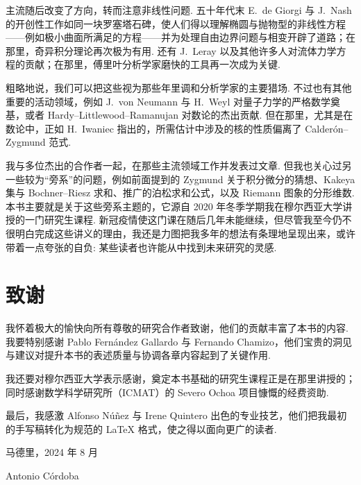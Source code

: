 主流随后改变了方向，转而注意非线性问题. 五十年代末 E.~de Giorgi 与 J.~Nash 的开创性工作如同一块罗塞塔石碑，使人们得以理解椭圆与抛物型的非线性方程——例如极小曲面所满足的方程——并为处理自由边界问题与相变开辟了道路；在那里，奇异积分理论再次极为有用. 还有 J.~Leray 以及其他许多人对流体力学方程的贡献；在那里，傅里叶分析学家磨快的工具再一次成为关键.

粗略地说，我们可以把这些视为那些年里调和分析学家的主要猎场. 不过也有其他重要的活动领域，例如 J.~von Neumann 与 H.~Weyl 对量子力学的严格数学奠基，或者 Hardy--Littlewood--Ramanujan 对数论的杰出贡献. 但在那里，尤其是在数论中，正如 H.~Iwaniec 指出的，所需估计中涉及的核的性质偏离了 Calderón--Zygmund 范式.

我与多位杰出的合作者一起，在那些主流领域工作并发表过文章. 但我也关心过另一些较为``旁系''的问题，例如前面提到的 Zygmund 关于积分微分的猜想、Kakeya 集与 Bochner--Riesz 求和、推广的泊松求和公式，以及 Riemann 图象的分形维数. 本书主要就是关于这些旁系主题的，它源自 2020 年冬季学期我在穆尔西亚大学讲授的一门研究生课程. 新冠疫情使这门课在随后几年未能继续，但尽管我至今仍不很明白完成这些讲义的理由，我还是力图把我多年的想法有条理地呈现出来，或许带着一点夸张的自负: 某些读者也许能从中找到未来研究的灵感.

\section*{致谢}

我怀着极大的愉快向所有尊敬的研究合作者致谢，他们的贡献丰富了本书的内容. 我要特别感谢 Pablo Fernández Gallardo 与 Fernando Chamizo，他们宝贵的洞见与建议对提升本书的表述质量与协调各章内容起到了关键作用.

我还要对穆尔西亚大学表示感谢，奠定本书基础的研究生课程正是在那里讲授的；同时感谢数学科学研究所（ICMAT）的 Severo Ochoa 项目慷慨的经费资助.

最后，我感激 Alfonso Núñez 与 Irene Quintero 出色的专业技艺，他们把我最初的手写稿转化为规范的 LaTeX 格式，使之得以面向更广的读者.

\begin{flushright}
  马德里，2024 年 8 月

  \medskip
  Antonio Córdoba
\end{flushright}

\vspace{1cm}


